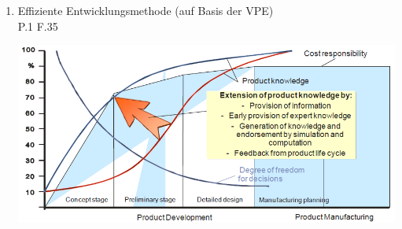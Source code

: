 \documentclass[10pt,a4paper,fleqn]{article}
\begin{document}
\begin{enumerate}
\begin{itemize}
\begin{itemize}
			\end{itemize}
	\end{itemize}	
\item Effiziente Entwicklungsmethode (auf Basis der VPE)\\
	P.1 F.35
	\begin{center}
		\includegraphics[scale=0.4]{methoden.png}
	\end{center}
\pagebreak	

\end{enumerate}
\end{document}
